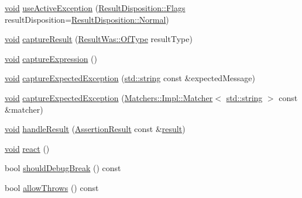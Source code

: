 \begin{DoxyCompactItemize}
\item 
\hyperlink{_s_d_l__opengles2__gl2ext_8h_ae5d8fa23ad07c48bb609509eae494c95}{void} \hyperlink{class_catch_1_1_result_builder_a5bbd2f14a678f3e8d0f791ac6d233d65}{use\+Active\+Exception} (\hyperlink{struct_catch_1_1_result_disposition_a3396cad6e2259af326b3aae93e23e9d8}{Result\+Disposition\+::\+Flags} result\+Disposition=\hyperlink{struct_catch_1_1_result_disposition_a3396cad6e2259af326b3aae93e23e9d8af3bd52347ed6f8796e8ce2f77bb39ea5}{Result\+Disposition\+::\+Normal})
\item 
\hyperlink{_s_d_l__opengles2__gl2ext_8h_ae5d8fa23ad07c48bb609509eae494c95}{void} \hyperlink{class_catch_1_1_result_builder_a10e467f7b7a4976e5d148b4d5066e8fd}{capture\+Result} (\hyperlink{struct_catch_1_1_result_was_a624e1ee3661fcf6094ceef1f654601ef}{Result\+Was\+::\+Of\+Type} result\+Type)
\item 
\hyperlink{_s_d_l__opengles2__gl2ext_8h_ae5d8fa23ad07c48bb609509eae494c95}{void} \hyperlink{class_catch_1_1_result_builder_af2ae2343965802eeeb0abbd4ea9d2d36}{capture\+Expression} ()
\item 
\hyperlink{_s_d_l__opengles2__gl2ext_8h_ae5d8fa23ad07c48bb609509eae494c95}{void} \hyperlink{class_catch_1_1_result_builder_a9ac96f6220c8dd8e4feee725c6228d77}{capture\+Expected\+Exception} (\hyperlink{_s_d_l__opengl__glext_8h_ae84541b4f3d8e1ea24ec0f466a8c568b}{std\+::string} const \&expected\+Message)
\item 
\hyperlink{_s_d_l__opengles2__gl2ext_8h_ae5d8fa23ad07c48bb609509eae494c95}{void} \hyperlink{class_catch_1_1_result_builder_a7d443d632eaeabe2cb36218b8dcb7400}{capture\+Expected\+Exception} (\hyperlink{struct_catch_1_1_matchers_1_1_impl_1_1_matcher}{Matchers\+::\+Impl\+::\+Matcher}$<$ \hyperlink{_s_d_l__opengl__glext_8h_ae84541b4f3d8e1ea24ec0f466a8c568b}{std\+::string} $>$ const \&matcher)
\item 
\hyperlink{_s_d_l__opengles2__gl2ext_8h_ae5d8fa23ad07c48bb609509eae494c95}{void} \hyperlink{class_catch_1_1_result_builder_ad8bb17e4ac590b75bf8630d8f3502f4e}{handle\+Result} (\hyperlink{class_catch_1_1_assertion_result}{Assertion\+Result} const \&\hyperlink{_s_d_l__opengl__glext_8h_a321ff419cd5252e54cf95e64dc6687ee}{result})
\item 
\hyperlink{_s_d_l__opengles2__gl2ext_8h_ae5d8fa23ad07c48bb609509eae494c95}{void} \hyperlink{class_catch_1_1_result_builder_a3085cdc46533d45bed6f652a2ac295c0}{react} ()
\item 
bool \hyperlink{class_catch_1_1_result_builder_a34cdbf7ad1e5b3cb4a94047f2d14bcb2}{should\+Debug\+Break} () const 
\item 
bool \hyperlink{class_catch_1_1_result_builder_a3dbf18a3a4b00173dab052a8864e435e}{allow\+Throws} () const 
\end{DoxyCompactItemize}


